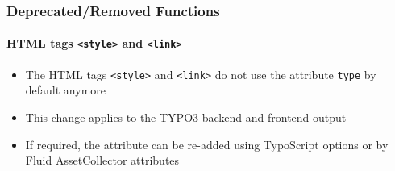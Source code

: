 %

\begin{frame}[fragile]
	\frametitle{Deprecated/Removed Functions}
	\framesubtitle{HTML tags \texttt{<style>} and \texttt{<link>}}

	\begin{itemize}
		\item The HTML tags \texttt{<style>} and \texttt{<link>} do not use the
			attribute \texttt{type} by default anymore
		\item This change applies to the TYPO3 backend and frontend output
		\item If required, the attribute can be re-added using TypoScript options
			or by Fluid AssetCollector attributes
	\end{itemize}

\end{frame}

